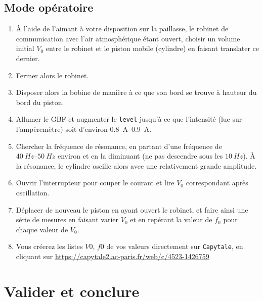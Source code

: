 \documentclass[a4paper, 11pt, final, garamond]{book}
\begin{document}
\subsection{Mode opératoire}
\begin{enumerate}
    \item À l'aide de l'aimant à votre disposition sur la paillasse, le robinet
        de communication avec l'air atmosphérique étant ouvert, choisir un
        volume initial $V_0$ entre le robinet et le piston mobile (cylindre) en
        faisant translater ce dernier.
    \item Fermer alors le robinet.
    \item Disposer alors la bobine de manière à ce que son bord se trouve à
        hauteur du bord du piston.
    \item Allumer le GBF et augmenter le \texttt{level} jusqu'à ce que
        l'intensité (lue sur l'ampèremètre) soit d'environ
        \SIrange{0.8}{0.9}{A}.
    \item Chercher la fréquence de résonance, en partant d'une fréquence de
        $\SIrange{40}{50}{Hz}$ environ et en la diminuant (ne pas descendre sous
        les $\SI{10}{Hz}$). À la résonance, le cylindre oscille alors avec une
        relativement grande amplitude.
    \item Ouvrir l'interrupteur pour couper le courant et lire $V_0$
        correspondant après oscillation.
    \item Déplacer de nouveau le piston en ayant ouvert le robinet, et faire
        ainsi une série de mesures en faisant varier $V_0$ et en repérant la
        valeur de $f_0$ pour chaque valeur de $V_0$.
    \item Vous créerez les listes $V0$, $f0$ de vos valeurs directement sur
        \texttt{Capytale}, en cliquant sur 
        \url{https://capytale2.ac-paris.fr/web/c/4523-1426759}
\end{enumerate}

\section{Valider et conclure}
\end{document}
